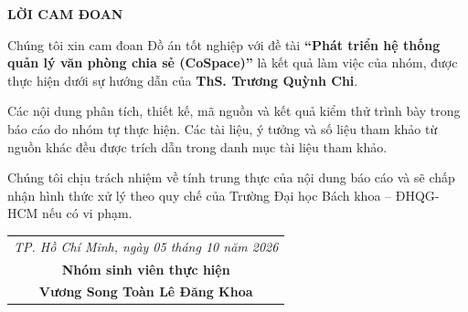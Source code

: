 \newpage
\begin{center}
\textbf{\LARGE LỜI CAM ĐOAN}
\end{center}
\vspace{0.5cm}

\par Chúng tôi xin cam đoan Đồ án tốt nghiệp với đề tài \textbf{``Phát triển hệ thống quản lý văn phòng chia sẻ (CoSpace)''} là kết quả làm việc của nhóm, được thực hiện dưới sự hướng dẫn của \textbf{ThS. Trương Quỳnh Chi}.

\par Các nội dung phân tích, thiết kế, mã nguồn và kết quả kiểm thử trình bày trong báo cáo do nhóm tự thực hiện. Các tài liệu, ý tưởng và số liệu tham khảo từ nguồn khác đều được trích dẫn trong danh mục tài liệu tham khảo.

\par Chúng tôi chịu trách nhiệm về tính trung thực của nội dung báo cáo và sẽ chấp nhận hình thức xử lý theo quy chế của Trường Đại học Bách khoa -- ĐHQG-HCM nếu có vi phạm.

\vspace{1.5cm}
\begin{flushright}
\begin{tabular}{c}
\textit{TP. Hồ Chí Minh, ngày 05 tháng 10 năm 2026} \\
\textbf{Nhóm sinh viên thực hiện} \\[2cm]
\textbf{Vương Song Toàn \hspace{1.5cm} Lê Đăng Khoa}
\end{tabular}
\end{flushright}
